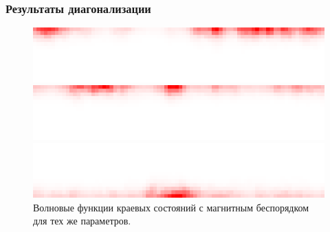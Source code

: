 \documentclass{beamer}
\begin{document}
\begin{frame}
    \frametitle{Результаты диагонализации}
    \begin{figure}[h]
        \centering
        \begin{minipage}[h]{0.9\linewidth}
            \centering
            \includegraphics[width=0.7\linewidth]{mgn_edge_st_1.png}
        \end{minipage}
        \vfill
        \begin{minipage}[h]{0.9\linewidth}
            \centering
            \includegraphics[width=0.7\linewidth]{mgn_edge_st_2.png}
        \end{minipage}
        \vfill
        \begin{minipage}[h]{0.9\linewidth}
            \centering
            \includegraphics[width=0.7\linewidth]{mgn_edge_st_3.png}
        \end{minipage}
        \caption{
            Волновые функции краевых состояний с магнитным беспорядком 
            для тех же параметров.
            }
        \label{fig:magnetic_disorder}
    \end{figure}
\end{frame}
\end{document}
